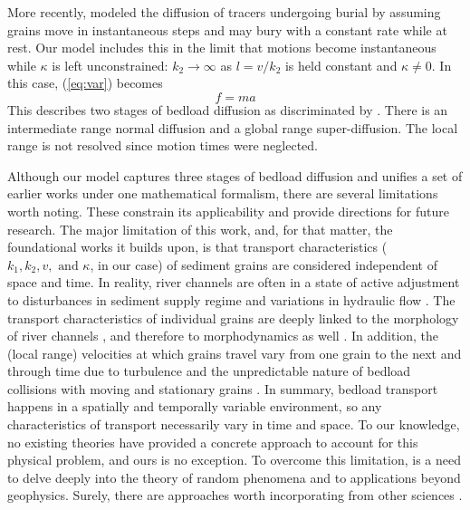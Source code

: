 \documentclass[]{agujournal2018}
\newcommand\be{\begin{equation}}
\newcommand\ee{\end{equation}}
\begin{document}
More recently, \citet{Wu2019} modeled the diffusion of tracers undergoing burial by assuming grains move in instantaneous steps and may bury with a constant rate while at rest.
Our model includes this in the limit that motions become instantaneous while $\kappa$ is left unconstrained: $k_2 \rightarrow \infty$ as $l = v/k_2$ is held constant and $\kappa \neq 0$.
In this case, (\ref{eq:var}) becomes
\be f=ma \ee
This describes two stages of bedload diffusion as discriminated by \citet{Wu2019}.
There is an intermediate range normal diffusion and a global range super-diffusion.
The local range is not resolved since motion times were neglected.

Although our model captures three stages of bedload diffusion and unifies a set of earlier works under one mathematical formalism, there are several limitations worth noting.
These constrain its applicability and provide directions for future research.
The major limitation of this work, and, for that matter, the foundational works it builds upon, is that transport characteristics ($k_1, k_2, v, \text{ and }\kappa$, in our case) of sediment grains are considered independent of space and time.
In reality, river channels are often in a state of active adjustment to disturbances in sediment supply regime and variations in hydraulic flow \citep{Church2017}. 
The transport characteristics of individual grains are deeply linked to the morphology of river channels \citep{Hassan2017}, and therefore to morphodynamics as well \citep[e.g.][]{Dhont2018}.
In addition, the (local range) velocities at which grains travel vary from one grain to the next \citep{Fathel2015, Heyman2016} and through time \citep{Fan2014, Ancey2014} due to turbulence \citep{Celik2014} and the unpredictable nature of bedload collisions with moving \citep{Lee2002} and stationary grains \citep{Gordon1972}.
In summary, bedload transport happens in a spatially and temporally variable environment, so any characteristics of transport necessarily vary in time and space.
To our knowledge, no existing theories have provided a concrete approach to account for this physical problem, and ours is no exception.
To overcome this limitation, is a need to delve deeply into the theory of random phenomena and to applications beyond geophysics.
Surely, there are approaches worth incorporating from other sciences \citep[e.g.][]{Kutner2017}.
\end{document}
